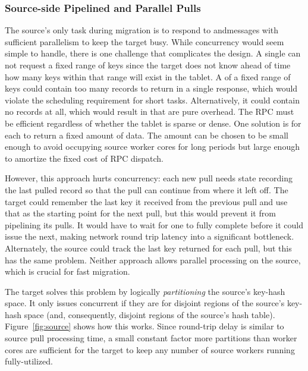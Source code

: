 \subsubsection{Source-side Pipelined and Parallel Pulls}
\label{sec:source}
The source's only task during migration is to respond
to \pull and\linebreak{}\priopull messages with sufficient parallelism to
keep the target busy. While concurrency would seem
simple to handle, there is one challenge that complicates the design.
A single \pull can not request a fixed range of keys since the target does not know
ahead of time how many keys within that range will exist in the tablet. A \pull of a fixed range of keys
could contain too many records to return in a single response, which would violate
the scheduling requirement for short tasks. Alternatively, it could contain no
records at all, which would result in \pulls that are pure overhead.
The \pull RPC must be efficient
regardless of whether the tablet is sparse or dense. One solution is for each
\pull to return a fixed amount of data. The amount can be chosen to be small
enough to avoid occupying source worker cores for long periods but large
enough to amortize the fixed cost of RPC dispatch.

However, this approach hurts concurrency:  each new pull needs state recording
the last pulled record so that the pull can continue from where it left off.
The target could remember the last key it received from the previous pull and
use that as the starting point for the next pull, but this would prevent it
from pipelining its pulls.
It would have to wait for one to fully complete before it could
issue the next, making network round trip latency into a significant bottleneck.
Alternately, the source could track
the last key returned for each pull, but this has the same problem.  Neither
approach allows parallel \pull processing on the source, which is
crucial for fast migration.

The target solves this problem by logically {\em partitioning} the source's key-hash
space. It only issues concurrent \pulls if they are for disjoint regions of the
source's key-hash space (and, consequently, disjoint regions of the source's
hash table).  Figure~\ref{fig:source} shows how this works.
Since round-trip delay is similar to source pull processing time,
a small constant factor more partitions than worker cores are sufficient for the
target to keep any number of source workers running fully-utilized.

